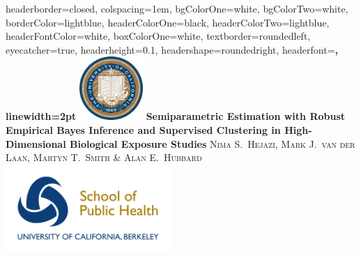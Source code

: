 \documentclass[landscape,a0paper,fontscale=0.285]{baposter} %
\newcommand{\1}{\mathbbm{1}}
\begin{document}
\begin{poster}
{
headerborder=closed, %
colspacing=1em, %
bgColorOne=white, %
bgColorTwo=white, %
borderColor=lightblue, %
headerColorOne=black, %
headerColorTwo=lightblue, %
headerFontColor=white, %
boxColorOne=white, %
textborder=roundedleft, %
eyecatcher=true, %
headerheight=0.1\textheight, %
headershape=roundedright, %
headerfont=\Large\bf\textsc, %
linewidth=2pt %
}
%
{\includegraphics[height=6.5em]{logo_cal.jpg}} %
{\textbf{\LARGE Semiparametric Estimation with Robust Empirical Bayes Inference
  and Supervised Clustering in High-Dimensional Biological Exposure
  Studies\vspace{0.5em}}}
{\textsc{Nima S.~Hejazi, Mark J.~van der Laan, Martyn T.~Smith \& Alan
  E.~Hubbard} \hspace{12pt} \textit{}}
{\includegraphics[height=9em]{logo_sph.jpg}} %


\end{poster}
\end{document}
